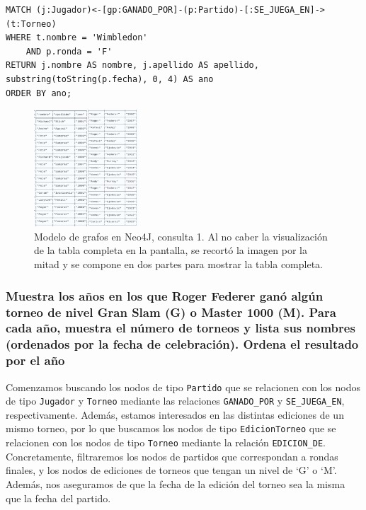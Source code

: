 \begin{verbatim}
MATCH (j:Jugador)<-[gp:GANADO_POR]-(p:Partido)-[:SE_JUEGA_EN]->(t:Torneo)
WHERE t.nombre = 'Wimbledon'
    AND p.ronda = 'F'
RETURN j.nombre AS nombre, j.apellido AS apellido, substring(toString(p.fecha), 0, 4) AS ano
ORDER BY ano;
\end{verbatim}

\begin{figure}[H]
\centering
\includegraphics[width=0.35\textwidth]{fotos/q1_neo.png}
\caption{Modelo de grafos en Neo4J, consulta 1. Al no caber la visualización de la tabla completa en la pantalla, se recortó la imagen por la mitad y se compone en dos partes para mostrar la tabla completa.}
\label{fig:q1_neo}
\end{figure}

\newpage


\subsubsection{Muestra los años en los que Roger Federer ganó algún torneo de nivel Gran Slam (G) o Master 1000 (M). Para cada año, muestra el número de torneos y lista sus nombres (ordenados por la fecha de celebración). Ordena el resultado por el año}

Comenzamos buscando los nodos de tipo \texttt{Partido} que se relacionen con los nodos de tipo \texttt{Jugador} y \texttt{Torneo} mediante las relaciones \texttt{GANADO\_POR} y \texttt{SE\_JUEGA\_EN}, respectivamente. Además, estamos interesados en las distintas ediciones de un mismo torneo, por lo que buscamos los nodos de tipo \texttt{EdicionTorneo} que se relacionen con los nodos de tipo \texttt{Torneo} mediante la relación \texttt{EDICION\_DE}. Concretamente, filtraremos los nodos de partidos que correspondan a rondas finales, y los nodos de ediciones de torneos que tengan un nivel de `G' o `M'. Además, nos aseguramos de que la fecha de la edición del torneo sea la misma que la fecha del partido. \\

